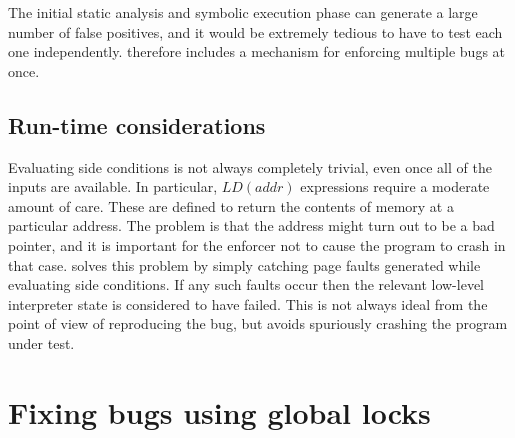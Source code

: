 The initial static analysis and symbolic execution phase can generate
a large number of false positives, and it would be extremely tedious
to have to test each one independently.  {\Implementation} therefore
includes a mechanism for enforcing multiple bugs at once.


\subsection{Run-time considerations}

Evaluating side conditions is not always
completely trivial, even once all of the inputs are available.  In
particular, $LD(addr)$ expressions require a moderate amount of care.
These are defined to return the contents of memory at a particular
address.  The problem is that the address might turn out to be a bad
pointer, and it is important for the enforcer not to cause the program
to crash in that case.  {\Implementation} solves this problem by
simply catching page faults generated while evaluating side
conditions.  If any such faults occur then the relevant low-level
interpreter state is considered to have failed.  This is not always
ideal from the point of view of reproducing the bug, but avoids
spuriously crashing the program under test.



\section{Fixing bugs using global locks}
\label{sect:fix_global_lock}

